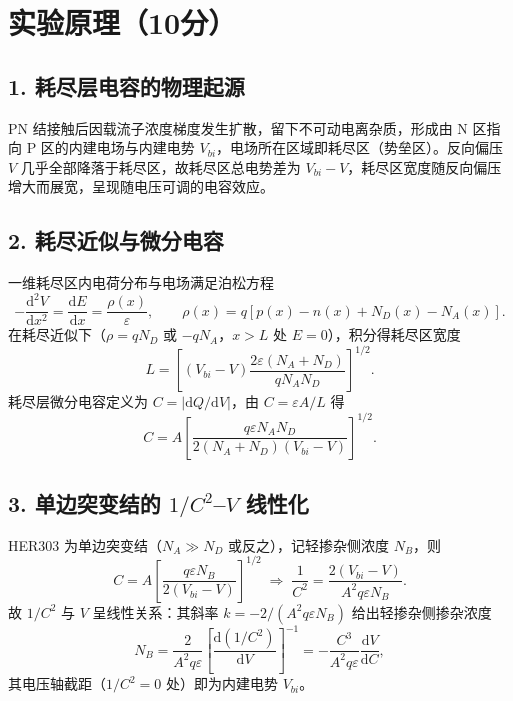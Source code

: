\documentclass[12pt,a4paper]{ctexart}
\begin{document}
\section*{实验原理（10分）}

\subsection*{1. 耗尽层电容的物理起源}
PN 结接触后因载流子浓度梯度发生扩散，留下不可动电离杂质，形成由 N 区指向 P 区的内建电场与内建电势 $V_{bi}$，电场所在区域即耗尽区（势垒区）。反向偏压 $V$ 几乎全部降落于耗尽区，故耗尽区总电势差为 $V_{bi}-V$，耗尽区宽度随反向偏压增大而展宽，呈现随电压可调的电容效应。

\subsection*{2. 耗尽近似与微分电容}
一维耗尽区内电荷分布与电场满足泊松方程
\begin{equation}
-\frac{\mathrm{d}^{2}V}{\mathrm{d}x^{2}}=\frac{\mathrm{d}E}{\mathrm{d}x}=\frac{\rho(x)}{\varepsilon},\qquad
\rho(x)=q\left[p(x)-n(x)+N_D(x)-N_A(x)\right].
\end{equation}
在耗尽近似下（$\rho=qN_D$ 或 $-qN_A$，$x>L$ 处 $E=0$），积分得耗尽区宽度
\begin{equation}
L=\left[\left(V_{bi}-V\right)\frac{2\varepsilon\left(N_A+N_D\right)}{qN_AN_D}\right]^{1/2}.
\end{equation}
耗尽层微分电容定义为 $C=\left|\mathrm{d}Q/\mathrm{d}V\right|$，由 $C=\varepsilon A/L$ 得
\begin{equation}
C=A\left[\frac{q\varepsilon N_AN_D}{2\left(N_A+N_D\right)\left(V_{bi}-V\right)}\right]^{1/2}.
\end{equation}

\subsection*{3. 单边突变结的 $1/C^{2}$--$V$ 线性化}
HER303 为单边突变结（$N_A\gg N_D$ 或反之），记轻掺杂侧浓度 $N_B$，则
\begin{equation}
C=A\left[\frac{q\varepsilon N_B}{2\left(V_{bi}-V\right)}\right]^{1/2}
\;\Longrightarrow\;
\frac{1}{C^{2}}=\frac{2\left(V_{bi}-V\right)}{A^{2}q\varepsilon N_B}.
\end{equation}
故 $1/C^{2}$ 与 $V$ 呈线性关系：其斜率 $k=-2/(A^{2}q\varepsilon N_B)$ 给出轻掺杂侧掺杂浓度
\begin{equation}
N_B=\frac{2}{A^{2}q\varepsilon}\left[\frac{\mathrm{d}\left(1/C^{2}\right)}{\mathrm{d}V}\right]^{-1}
=-\frac{C^{3}}{A^{2}q\varepsilon}\frac{\mathrm{d}V}{\mathrm{d}C},
\end{equation}
其电压轴截距（$1/C^{2}=0$ 处）即为内建电势 $V_{bi}$。
\end{document}
